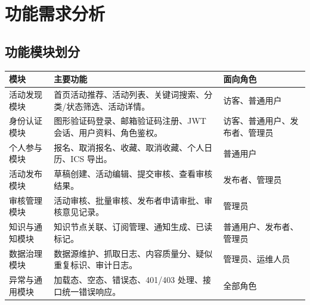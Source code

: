 \documentclass[12pt,a4paper]{ctexart}
\begin{document}
  \section{功能需求分析}
  \subsection{功能模块划分}
  \noindent\begin{tabularx}{\textwidth}{p{2.7cm}Y Y}
  \toprule 模块 & 主要功能 & 面向角色 \\\midrule
  活动发现模块 & 首页活动推荐、活动列表、关键词搜索、分类/状态筛选、活动详情。 & 访客、普通用户 \\
  身份认证模块 & 图形验证码登录、邮箱验证码注册、JWT 会话、用户资料、角色鉴权。 & 访客、普通用户、发布者、管理员 \\
  个人参与模块 & 报名、取消报名、收藏、取消收藏、个人日历、ICS 导出。 & 普通用户 \\
  活动发布模块 & 草稿创建、活动编辑、提交审核、查看审核结果。 & 发布者、管理员 \\
  审核管理模块 & 活动审核、批量审核、发布者申请审批、审核意见记录。 & 管理员 \\
  知识与通知模块 & 知识节点关联、订阅管理、通知生成、已读标记。 & 普通用户、发布者、管理员 \\
  数据治理模块 & 数据源维护、抓取日志、内容质量分、疑似重复标识、审计日志。 & 管理员、运维人员 \\
  异常与通用模块 & 加载态、空态、错误态、401/403 处理、接口统一错误响应。 & 全部角色 \\
  \bottomrule
  \end{tabularx}
\end{document}
